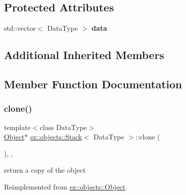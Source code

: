 \subsection*{Protected Attributes}
\begin{DoxyCompactItemize}
\item 
\mbox{\label{classez_1_1objects_1_1Stack_a3f486f3a1f105bb7ccf85ba324fa50d1}} 
std\+::vector$<$ Data\+Type $>$ {\bfseries data}
\end{DoxyCompactItemize}
\subsection*{Additional Inherited Members}


\subsection{Member Function Documentation}
\mbox{\label{classez_1_1objects_1_1Stack_a350a12fecda720df715bf1d773e1a696}} 
\subsubsection{\texorpdfstring{clone()}{clone()}}
{\footnotesize\ttfamily template$<$class Data\+Type$>$ \\
\hyperlink{classez_1_1objects_1_1Object}{Object}$\ast$ \hyperlink{classez_1_1objects_1_1Stack}{ez\+::objects\+::\+Stack}$<$ Data\+Type $>$\+::clone (\begin{DoxyParamCaption}{ }\end{DoxyParamCaption})\hspace{0.3cm}{\ttfamily [inline]}, {\ttfamily [override]}, {\ttfamily [virtual]}}

return a copy of the object 

Reimplemented from \hyperlink{classez_1_1objects_1_1Object_acf444b2581d898eb4b8c92c2d5865c9e}{ez\+::objects\+::\+Object}.

\mbox{\label{classez_1_1objects_1_1Stack_a47b43cce6f59f79ffa0b344c109aae35}} 
